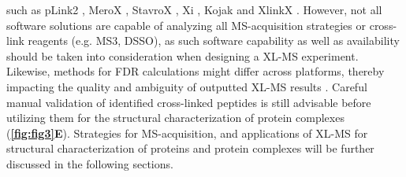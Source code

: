 such as pLink2 \cite{Chen_2019b}, MeroX \cite{Gotze_2015}, StavroX \cite{Gotze_2012}, Xi \cite{Chen_2019a}, Kojak \cite{Hoopmann_2015} and XlinkX \cite{Klykov_2018}. However, not all software solutions are capable of analyzing all MS-acquisition strategies or cross-link reagents (e.g. MS3, DSSO), as such software capability as well as availability should be taken into consideration when designing a XL-MS experiment. Likewise, methods for FDR calculations might differ across platforms, thereby impacting the quality and ambiguity of outputted XL-MS results \cite{Matzinger_2022}. Careful manual validation of identified cross-linked peptides is still advisable before utilizing them for the structural characterization of protein complexes (\textbf{\autoref{fig:fig3}E}). Strategies for MS-acquisition, and applications of XL-MS for structural characterization of proteins and protein complexes will be further discussed in the following sections.

